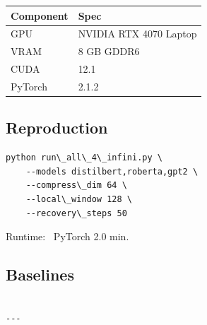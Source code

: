 \begin{table}[H]
\centering
\small
\begin{tabular}{ll}
\toprule
\textbf{Component} & \textbf{Spec} \\
\midrule
GPU & NVIDIA RTX 4070 Laptop \\
VRAM & 8 GB GDDR6 \\
CUDA & 12.1 \\
PyTorch & 2.1.2 \\
\bottomrule
\end{tabular}
\end{table}

\subsection{Reproduction}

\begin{lstlisting}
python run\_all\_4\_infini.py \
    --models distilbert,roberta,gpt2 \
    --compress\_dim 64 \
    --local\_window 128 \
    --recovery\_steps 50
\end{lstlisting}

Runtime: ~PyTorch 2.0 min.

\subsection{Baselines}

\begin{lstlisting}

---
\end{lstlisting}